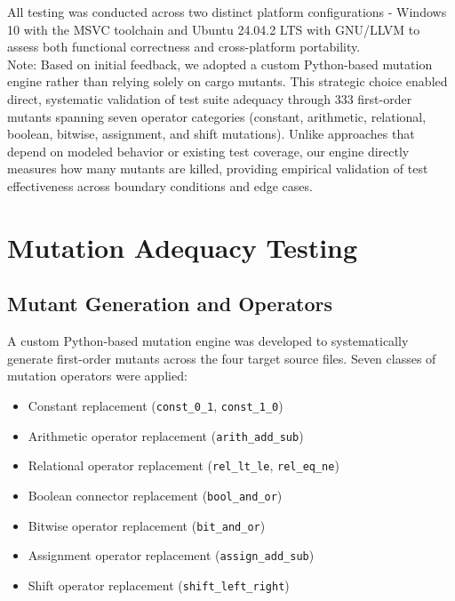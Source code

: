 \documentclass[11pt,a4paper]{article}
\begin{document}
All testing was conducted across two distinct platform configurations - Windows 10 with the MSVC toolchain and Ubuntu 24.04.2 LTS with GNU/LLVM to assess both functional correctness and cross-platform portability.\\

Note: Based on initial feedback, we adopted a custom Python-based mutation engine rather than relying solely on cargo mutants. This strategic choice enabled direct, systematic validation of test suite adequacy through 333 first-order mutants spanning seven operator categories (constant, arithmetic, relational, boolean, bitwise, assignment, and shift mutations). Unlike approaches that depend on modeled behavior or existing test coverage, our engine directly measures how many mutants are killed, providing empirical validation of test effectiveness across boundary conditions and edge cases.


\section{Mutation Adequacy Testing}

\subsection{Mutant Generation and Operators}

A custom Python-based mutation engine was developed to systematically generate first-order mutants across the four target source files. Seven classes of mutation operators were applied:

\begin{itemize}[noitemsep]
\item Constant replacement (\texttt{const\_0\_1}, \texttt{const\_1\_0})
\item Arithmetic operator replacement (\texttt{arith\_add\_sub})
\item Relational operator replacement (\texttt{rel\_lt\_le}, \texttt{rel\_eq\_ne})
\item Boolean connector replacement (\texttt{bool\_and\_or})
\item Bitwise operator replacement (\texttt{bit\_and\_or})
\item Assignment operator replacement (\texttt{assign\_add\_sub})
\item Shift operator replacement (\texttt{shift\_left\_right})
\end{itemize}
\end{document}
